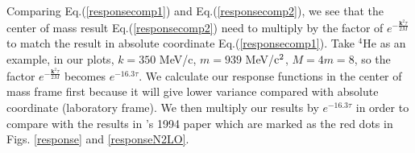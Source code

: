 \documentclass[12pt,letterpaper,UTF8]{report}
\begin{document}
{Comparing Eq.(\ref{responsecomp1}) and Eq.(\ref{responsecomp2}), we see that the center of mass result Eq.(\ref{responsecomp2}) need to multiply by the factor of $e^{-\frac{\bm{k}^2 \tau}{2M}}$ to match the result in absolute coordinate Eq.(\ref{responsecomp1}). Take $^4$He as an example, in our plots, $k=350$ MeV/c, $m=939$ MeV/$\rm{c}^2$, $M=4m=8$, so the factor $e^{- \frac{\bm{k}^2 \tau}{2M}}$ becomes $e^{- 16.3\tau}$.
We calculate our response functions in the center of mass frame first because it will give lower variance compared with absolute coordinate (laboratory frame). We then multiply our results by $e^{- 16.3\tau}$ in order to compare with the results in \citeauthor{Carlson94a}'s 1994 paper which are marked as the red dots in Figs. \ref{response} and \ref{responseN2LO}.


















}
\end{document}
